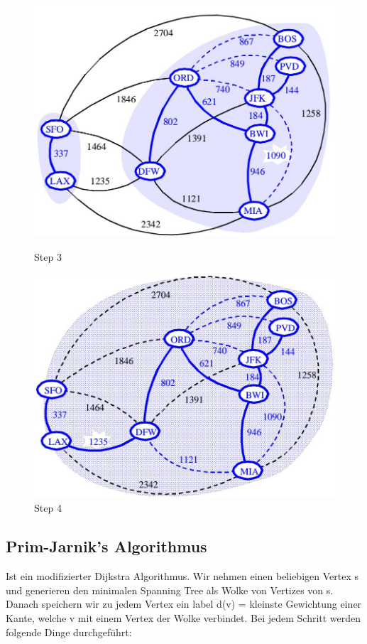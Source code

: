 \begin{figure}[ht!]
	\centering
	\begin{minipage}[t]{0.4\textwidth}
		\centering
		\includegraphics[width=0.9\linewidth]{images/kruskal_s3}
		\caption{Step 3}
		\label{fig:kruskals3}
	\end{minipage}
	\begin{minipage}[t]{0.4\textwidth}
		\centering
		\includegraphics[width=0.9\linewidth]{images/kruskal_s4}
		\caption{Step 4}
		\label{fig:kruskals4}
	\end{minipage}
\end{figure}

\subsection{Prim-Jarnik's Algorithmus}
Ist ein modifizierter Dijkstra Algorithmus. Wir nehmen einen beliebigen Vertex s und generieren den minimalen Spanning Tree als Wolke von Vertizes von s. Danach speichern wir zu jedem Vertex ein label d(v) = kleinste Gewichtung einer Kante, welche v mit einem Vertex der Wolke verbindet. Bei jedem Schritt werden folgende Dinge durchgeführt:

